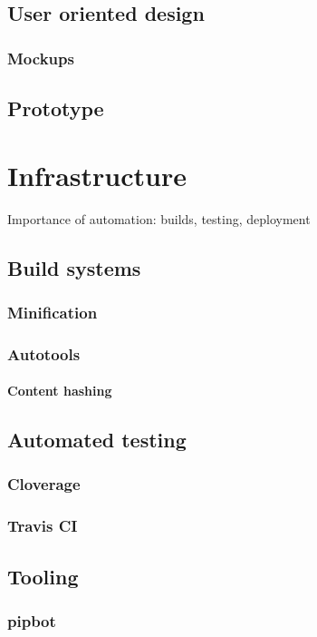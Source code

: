\section{User oriented design}
\subsection{Mockups}

\section{Prototype}


\chapter{Infrastructure}
Importance of automation: builds, testing, deployment

\section{Build systems}
\subsection{Minification}
\subsection{Autotools}
\subsubsection{Content hashing}

\section{Automated testing}
\subsection{Cloverage}
\subsection{Travis CI}

\section{Tooling}
\subsection{pipbot}
